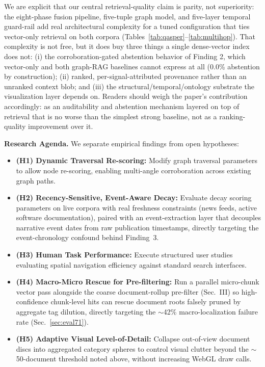 \documentclass[conference,a4paper]{IEEEtran}
\begin{document}
We are explicit that our central retrieval-quality claim is parity, not superiority: the eight-phase fusion pipeline, five-tuple graph model, and five-layer temporal guard-rail add real architectural complexity for a tuned configuration that ties vector-only retrieval on both corpora (Tables~\ref{tab:qasper}--\ref{tab:multihop}). That complexity is not free, but it does buy three things a single dense-vector index does not: (i) the corroboration-gated abstention behavior of Finding 2, which vector-only and both graph-RAG baselines cannot express at all (0.0\% abstention by construction); (ii) ranked, per-signal-attributed provenance rather than an unranked context blob; and (iii) the structural/temporal/ontology substrate the visualization layer depends on. Readers should weigh the paper's contribution accordingly: as an auditability and abstention mechanism layered on top of retrieval that is no worse than the simplest strong baseline, not as a ranking-quality improvement over it.

\textbf{Research Agenda.} We separate empirical findings from open hypotheses:
\begin{itemize}
\item \textbf{(H1) Dynamic Traversal Re-scoring:} Modify graph traversal parameters to allow node re-scoring, enabling multi-angle corroboration across existing graph paths.
\item \textbf{(H2) Recency-Sensitive, Event-Aware Decay:} Evaluate decay scoring parameters on live corpora with real freshness constraints (news feeds, active software documentation), paired with an event-extraction layer that decouples narrative event dates from raw publication timestamps, directly targeting the event-chronology confound behind Finding~3.
\item \textbf{(H3) Human Task Performance:} Execute structured user studies evaluating spatial navigation efficiency against standard search interfaces.
\item \textbf{(H4) Macro-Micro Rescue for Pre-filtering:} Run a parallel micro-chunk vector pass alongside the coarse document-rollup pre-filter (Sec.~III) so high-confidence chunk-level hits can rescue document roots falsely pruned by aggregate tag dilution, directly targeting the $\sim$42\% macro-localization failure rate (Sec.~\ref{sec:eval71}).
\item \textbf{(H5) Adaptive Visual Level-of-Detail:} Collapse out-of-view document discs into aggregated category spheres to control visual clutter beyond the $\sim$50-document threshold noted above, without increasing WebGL draw calls.
\end{itemize}
\end{document}
